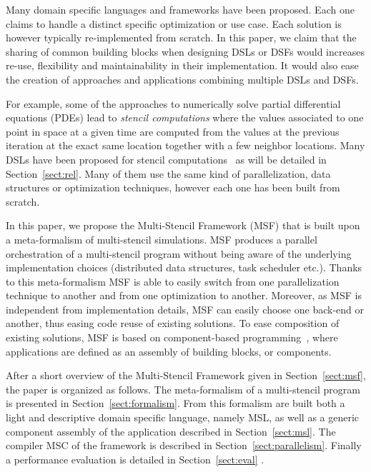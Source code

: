 Many domain specific languages and frameworks have been proposed. Each one claims to handle a distinct specific optimization or use case.
Each solution is however typically re-implemented from scratch.
In this paper, we claim that the sharing of common building blocks when designing DSLs or DSFs would increases re-use, flexibility and maintainability in their implementation.
It would also ease the creation of approaches and applications combining multiple DSLs and DSFs.

For example, some of the approaches to numerically solve partial differential equations (PDEs) lead to \emph{stencil computations} where the values associated to one point in space at a given time are computed from the values at the previous iteration at the exact same location together with a few neighbor locations.
Many DSLs have been proposed for stencil computations~\cite{spaaTangCKLL11,citeulike12258902,Ragan-Kelley:2013:HLC:2491956.2462176,DeVito:2011:LDS:2063384.2063396,Camier:2015:IPP:2820083.2820107} as will be detailed in Section~\ref{sect:rel}.
Many of them use the same kind of parallelization, data structures or optimization techniques, however each one has been built from scratch. 

In this paper, we propose the Multi-Stencil Framework (MSF) that is built upon a meta-formalism of multi-stencil simulations. MSF produces a parallel orchestration of a multi-stencil program without being aware of the underlying implementation choices (\eg distributed data structures, task scheduler etc.). Thanks to this meta-formalism MSF is able to easily switch from one parallelization technique to another and from one optimization to another. Moreover, as MSF is independent from implementation details, MSF can easily choose one back-end or another, thus easing code reuse of existing solutions.
To ease composition of existing solutions, MSF is based on component-based programming~\cite{Szyperski:2002:CSB:515228}, where applications are defined as an assembly of building blocks, or components.

After a short overview of the Multi-Stencil Framework given in Section~\ref{sect:msf}, the paper is organized as follows. The meta-formalism of a multi-stencil program is presented in Section~\ref{sect:formalism}. From this formalism are built both a light and descriptive domain specific language, namely MSL, as well as a generic component assembly of the application described in Section~\ref{sect:msl}. The compiler MSC of the framework is described in Section~\ref{sect:parallelism}. Finally a performance evaluation is detailed in Section~\ref{sect:eval} .

